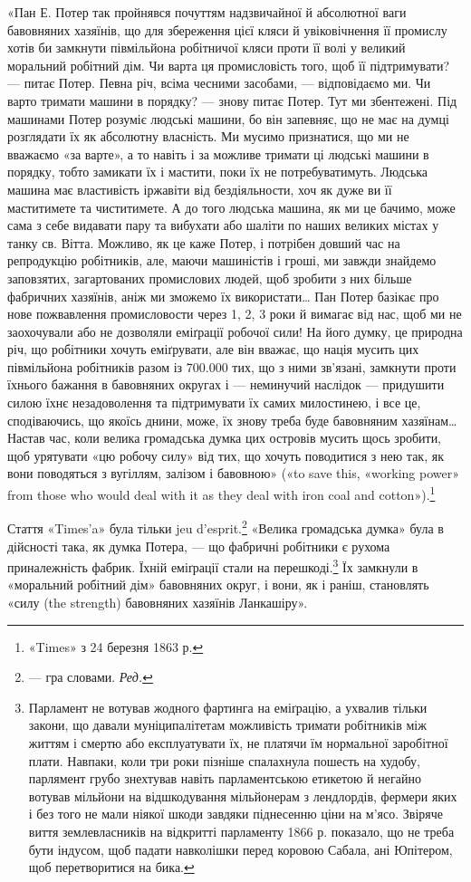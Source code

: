 «Пан Е. Потер так пройнявся почуттям надзвичайної й абсолютної
ваги бавовняних хазяїнів, що для збереження цієї кляси
й увіковічнення її промислу хотів би замкнути півмільйона робітничої
кляси проти її волі у великий моральний робітний дім.
Чи варта ця промисловість того, щоб її підтримувати? — питає
Потер. Певна річ, всіма чесними засобами, — відповідаємо ми.
Чи варто тримати машини в порядку? — знову питає Потер.
Тут ми збентежені. Під машинами Потер розуміє людські машини,
бо він запевняє, що не має на думці розглядати їх як абсолютну
власність. Ми мусимо признатися, що ми не вважаємо «за варте»,
а то навіть і за можливе тримати ці людські машини в порядку,
тобто замикати їх і мастити, поки їх не потребуватимуть. Людська
машина має властивість іржавіти від бездіяльности, хоч
як дуже ви її маститимете та чиститимете. А до того людська
машина, як ми це бачимо, може сама з себе видавати пару та вибухати
або шаліти по наших великих містах у танку св. Вітта.
Можливо, як це каже Потер, і потрібен довший час на репродукцію
робітників, але, маючи машиністів і гроші, ми завжди
знайдемо заповзятих, загартованих промислових людей, щоб
зробити з них більше фабричних хазяїнів, аніж ми зможемо їх
використати\dots{} Пан Потер базікає про нове пожвавлення промисловости
через 1, 2, 3 роки й вимагає від нас, щоб ми не заохочували
або не дозволяли еміґрації робочої сили! На його думку,
це природна річ, що робітники хочуть еміґрувати, але він вважає,
що нація мусить цих півмільйона робітників разом із 700.000 тих,
що з ними зв’язані, замкнути проти їхнього бажання в бавовняних
округах і — неминучий наслідок — придушити силою їхнє
незадоволення та підтримувати їх самих милостинею, і все це,
сподіваючись, що якоїсь днини, може, їх знову треба буде бавовняним
хазяїнам\dots{} Настав час, коли велика громадська думка
цих островів мусить щось зробити, щоб урятувати «цю робочу
силу» від тих, що хочуть поводитися з нею так, як вони поводяться
з вугіллям, залізом і бавовною» («to save this, «working
power» from those who would deal with it as they deal with iron
coal and cotton»).\footnote{
«Times» з 24 березня 1863 р.
}

Стаття «Times’a» була тільки jeu d’esprit.\footnote*{
— гра словами. \emph{Ред.}
} «Велика громадська
думка» була в дійсності така, як думка Потера, — що фабричні
робітники є рухома приналежність фабрик. Їхній еміґрації
стали на перешкоді.\footnote{
Парламент не вотував жодного фартинга на еміґрацію, а ухвалив
тільки закони, що давали муніципалітетам можливість тримати робітників
між життям і смертю або експлуатувати їх, не платячи їм нормальної
заробітної плати. Навпаки, коли три роки пізніше спалахнула пошесть
на худобу, парлямент грубо знехтував навіть парламентською етикетою й
негайно вотував мільйони на відшкодування мільйонерам з лендлордів,
фермери яких і без того не мали ніякої шкоди завдяки піднесенню ціни
на м’ясо. Звіряче виття землевласників на відкритті парламенту 1866 р.
показало, що не треба бути індусом, щоб падати навколішки перед коровою
Сабала, ані Юпітером, щоб перетворитися на бика.
} Їх замкнули в «моральний робітний
дім» бавовняних округ, і вони, як і раніш, становлять «силу
(the strength) бавовняних хазяїнів Ланкашіру».

